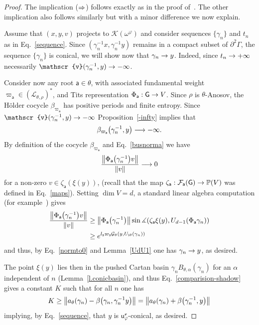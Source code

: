 \documentclass[AHL,Unicode,longabstracts,MathTools]{cedram}
\newcommand{\ii}{\mathrm{i}}
\newcommand{\cartan}{a}
\newcommand{\scr}{\mathscr}
\newcommand{\cc}{\scr{v}}
\renewcommand{\sf}[1]{{\mathsf{#1}}}
\newcommand{\sroot}{{\sf{a}}}
\newcommand{\sfG}{\sf{G}}
\newcommand{\G}{\sf{\Gamma}}
\newcommand{\cal}{\mathcal}
\newcommand{\Gr}{\cal{G}}
\newcommand{\calF}{\mathcal{F}}
\newcommand{\calL}{\mathcal{L}}
\renewcommand{\P}{\mathbb{P}}
\newcommand{\g}{\gamma}
\renewcommand{\t}{\theta}
\newcommand{\bord}{\partial}
\newcommand{\Fund}{\Phi}
\newcommand{\peso}{\varpi}
\newcommand{\rfr}{\beta}
\newcommand{\df}{\omega}
\renewcommand{\/}{\backslash}
\renewcommand{\angle}{\measuredangle}
\newcommand{\<}{\langle}
\renewcommand{\>}{\rangle}
\renewcommand*{\to}{\mathchoice{\longrightarrow}{\rightarrow}{\rightarrow}{\rightarrow}}
\renewcommand*{\implies}{\mathchoice{\Longrightarrow}{\Rightarrow}{\Rightarrow}{\Rightarrow}}
\let\originalleft\left
\let\originalright\right
\renewcommand{\left}{\mathopen{}\mathclose\bgroup\originalleft}
\renewcommand{\right}{\aftergroup\egroup\originalright}
\begin{document}
\begin{proof}
The implication ($\implies$) follows exactly as in the proof of~\cite[Proposition~5.13.4]{dichotomy}. The other implication also follows similarly but with a minor difference we now explain.

Assume that $(x,y,v)$ projects to $\cal K(\df^\varphi)$ and consider sequences $\{\g_n\}$ and $t_n$ as in Eq.~\eqref{sequence}. Since $(\g_n^{-1}x,\g_n^{-1}y)$ remains in a compact subset of $\bord^2\G$, the sequence $\{\g_n\}$ is conical, we will show now that $\g_n\to y$. Indeed, since $t_n\to+\infty$ necessarily $\cc(\g_n^{-1},y)\to-\infty$.

Consider now any root $\sroot\in\t$, with associated fundamental weight $\peso_{\sroot}\in(\calL_{\t,\rho})^*$, and Tits representation $\Fund_{\sroot}:\sfG\to V$. Since $\rho$ is $\theta$-Anosov, the H\"older cocycle $\rfr_{\peso_{\sroot}}$ has positive periods and finite entropy. Since $\cc(\g_n^{-1},y)\to-\infty$ Proposition~\ref{-infty} implies that
\[
\rfr_{\peso_{\sroot}}\left(\g_n^{-1},y\right)\to-\infty.
\]
By definition of the cocycle $\rfr_{\peso_{\sroot}}$ and Eq.~\eqref{busnorma} we have
\begin{equation}\label{normto0}
\frac{\left\|\Fund_{\sroot}\left(\g_n^{-1}\right)v\right\|}{\|v\|}\to0
\end{equation}
for a non-zero $v\in\zeta_\sroot(\xi(y))$, (recall that the map $\zeta_\sroot:\calF_{\sroot}(\sfG)\to \P(V)$ was defined in Eq.~\eqref{maps}). Setting $\dim V=d$, a standard linear algebra computation (for example~\cite[Lemma~A.3]{BPS})
gives
\begin{align*}
\frac{\left\|\Fund_{\sroot}\left(\g_n^{-1}\right)v\right\|}{\|v\|} & \geq\left\|\Fund_{\sroot}\left(\g_n^{-1}\right)\right\|\sin\angle\left(\zeta_\sroot\xi(y),U_{d-1}(\Fund_{\sroot}\g_n)\right)\\
& \geq e^{l_\sroot\peso_\sroot\Gr_\t\left(y,U_{\ii\t}(\g_n)\right)}
\end{align*}
and thus, by Eq.~\eqref{normto0} and Lemma~\ref{UdU1} one has $\g_n\to y$, as desired.

The point $\xi(y)$ lies then in the pushed Cartan basin $\g_nB_{\t,\alpha}(\g_n)$ for an $\alpha$ independent of $n$ (Lemma~\ref{l.conicbasin}), and thus Eq.~\eqref{comparision-shadow} gives a constant $K$ such that for all $n$ one has
\[
K\geq\left\|\cartan_\t(\g_n)-\rfr\left(\g_n,\g_n^{-1}y\right)\right\|=\left\|\cartan_\t(\g_n)+\rfr\left(\g_n^{-1},y\right)\right\|
\]
implying, by Eq.~\eqref{sequence}, that $y$ is $\sf u_\varphi^\cc$-conical, as desired.
\end{proof}
\end{document}
